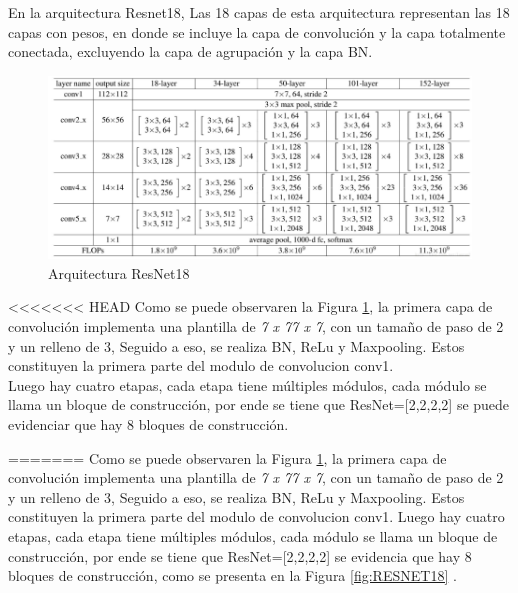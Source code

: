 				\newpage
				En la arquitectura Resnet18, Las 18 capas de esta arquitectura representan las 18 capas con pesos, en donde se incluye la capa de convolución y la capa totalmente conectada, excluyendo la capa de agrupación y la capa BN.
				
				\begin{figure}[ht]
					\centering
					\includegraphics[scale=0.65]{Figs/68.png}
					\caption{Arquitectura ResNet18}
					\label{fig:ArqRes18}
				\end{figure}
				
<<<<<<< HEAD
				Como se puede observaren la Figura \ref{fig:ArqRes18}, la primera capa de convolución implementa una plantilla de \textit{7 x 77 x 7}, con un tamaño de paso de 2 y un relleno de 3, Seguido a eso, se realiza BN, ReLu y Maxpooling. Estos constituyen la primera parte del modulo de convolucion conv1.
				\\
				Luego hay cuatro etapas, cada etapa tiene múltiples módulos, cada módulo se llama un bloque de construcción, por ende se tiene que ResNet=[2,2,2,2] se puede evidenciar que hay 8 bloques de construcción.

=======
				Como se puede observaren la Figura \ref{fig:ArqRes18}, la primera capa de convolución implementa una plantilla de \textit{7 x 77 x 7}, con un tamaño de paso de 2 y un relleno de 3, Seguido a eso, se realiza BN, ReLu y Maxpooling. Estos constituyen la primera parte del modulo de convolucion conv1.	
				Luego hay cuatro etapas, cada etapa tiene múltiples módulos, cada módulo se llama un bloque de construcción, por ende se tiene que ResNet=[2,2,2,2] se evidencia que hay 8 bloques de construcción, como se presenta en la Figura \ref{fig:RESNET18} \cite{ref_5}.				
		
